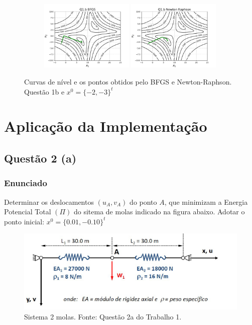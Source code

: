 \documentclass[10pt, a4paper]{article}
\begin{document}
\begin{figure}[H]
  \centering
  \begin{subfigure}[b]{\textwidth}
    \includegraphics[width=0.49\textwidth]{figuras/Q1.b_BFGS_P0=[-2e-3].pdf}
    \includegraphics[width=0.49\textwidth]{figuras/Q1.b_Newton Raphson_P0=[-2e-3].pdf}
  \end{subfigure}
  \caption{Curvas de nível e os pontos obtidos pelo BFGS e Newton-Raphson. Questão 1b e $x^0 = \{-2,-3\}^t$}
\end{figure}

\section{Aplicação da Implementação}
\subsection{Questão 2 (a)}
\subsubsection{Enunciado}
Determinar os deslocamentos $(u_A, v_A)$ do ponto $A$, que minimizam a Energia Potencial Total $(\Pi)$ do sitema de molas
indicado na figura abaixo. Adotar o ponto inicial: $x^0 = \{0.01, -0.10\} ^t$

\begin{figure}[H]
  \centering
  \includegraphics[scale=1]{figuras/enunciado_2a.png}
  \caption{Sistema 2 molas. Fonte: Questão 2a do Trabalho 1. }
\end{figure}
\end{document}
